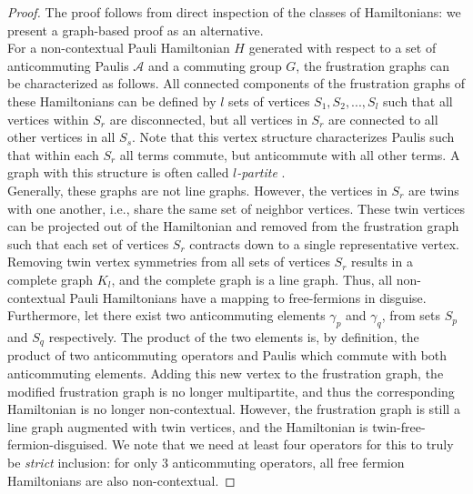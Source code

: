 \documentclass[%
 aip,
 amsmath,amssymb,
 reprint,%
]{revtex4-1}
\begin{document}
\begin{proof}
    The proof follows from direct inspection of the classes of Hamiltonians: we present a graph-based proof as an alternative. \\ 
    \indent For a non-contextual Pauli Hamiltonian $H$ generated with respect to a set of anticommuting Paulis $\mathcal{A}$ and a commuting group $G$, the frustration graphs can be characterized as follows. All connected components of the frustration graphs of these Hamiltonians can be defined by $l$ sets of vertices $S_1, S_2, ..., S_l$ such that all vertices within $S_r$ are disconnected, but all vertices in $S_r$ are connected to all other vertices in all $S_s$. Note that this vertex structure characterizes Paulis such that within each $S_r$ all terms commute, but anticommute with all other terms. A graph with this structure is often called {\it $l$-partite} \cite{Ralli_ContextPauli}. \\ 
    \indent Generally, these graphs are not line graphs. However, the vertices in $S_r$ are twins with one another, i.e., share the same set of neighbor vertices. These twin vertices can be projected out of the Hamiltonian and removed from the frustration graph such that each set of vertices $S_r$ contracts down to a single representative vertex. Removing twin vertex symmetries from all sets of vertices $S_r$ results in a complete graph $K_l$, and the complete graph is a line graph. Thus, all non-contextual Pauli Hamiltonians {have a mapping to free-fermions in disguise}. \\ 
    \indent Furthermore, let there exist two anticommuting elements $\gamma_p$ and $\gamma_q$, from sets $S_p$ and $S_q$ respectively. 
    The product of the two elements is, by definition, the product of two anticommuting operators and Paulis which commute with both anticommuting elements. Adding this new vertex to the frustration graph, the modified frustration graph is no longer multipartite, and thus the corresponding Hamiltonian is no longer non-contextual. However, the frustration graph is still a line graph augmented with twin vertices, and the Hamiltonian is twin-free-fermion-disguised. We note that we need at least four operators for this to truly be {\it strict} inclusion: for only $3$ anticommuting operators, all free fermion Hamiltonians are also non-contextual. 
\end{proof}
\end{document}
